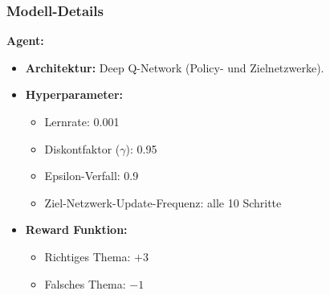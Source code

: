 \documentclass{beamer}
\begin{document}
\begin{frame}
    \label{sec6}
    \frametitle{Modell-Details}

    \textbf{Agent:}
    \begin{itemize}
        \item \textbf{Architektur:} Deep Q-Network (Policy- und Zielnetzwerke).
        \item \textbf{Hyperparameter:}
        \begin{itemize}
            \item Lernrate: 0.001
            \item Diskontfaktor ($\gamma$): 0.95
            \item Epsilon-Verfall: 0.9
            \item Ziel-Netzwerk-Update-Frequenz: alle 10 Schritte
        \end{itemize}
        \item \textbf{Reward Funktion:}
        \begin{itemize}
            \item Richtiges Thema: $+3$
            \item Falsches Thema: $-1$
        \end{itemize}
    \end{itemize}


    
\end{frame}
\end{document}
